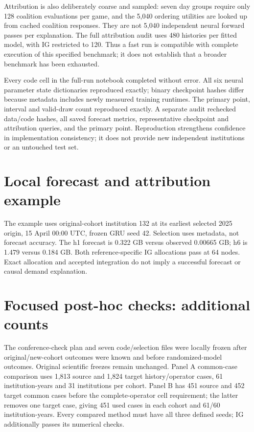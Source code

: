 \documentclass[conference]{IEEEtran}
\begin{document}
Attribution is also deliberately coarse and sampled: seven day groups require only 128 coalition evaluations per game, and the 5,040 ordering utilities are looked up from cached coalition responses. They are not 5,040 independent neural forward passes per explanation. The full attribution audit uses 480 histories per fitted model, with IG restricted to 120. Thus a fast run is compatible with complete execution of this specified benchmark; it does not establish that a broader benchmark has been exhausted.

Every code cell in the full-run notebook completed without error. All six neural parameter state dictionaries reproduced exactly; binary checkpoint hashes differ because metadata includes newly measured training runtimes. The primary point, interval and valid-draw count reproduced exactly. A separate audit rechecked data/code hashes, all saved forecast metrics, representative checkpoint and attribution queries, and the primary point. Reproduction strengthens confidence in implementation consistency; it does not provide new independent institutions or an untouched test set.


\section{Local forecast and attribution example}
The example uses original-cohort institution 132 at its earliest selected 2025 origin, 15 April 00:00 UTC, frozen GRU seed 42. Selection uses metadata, not forecast accuracy. The h1 forecast is 0.322 GB versus observed 0.00665 GB; h6 is 1.479 versus 0.184 GB. Both reference-specific IG allocations pass at 64 nodes. Exact allocation and accepted integration do not imply a successful forecast or causal demand explanation.


\section{Focused post-hoc checks: additional counts}
The conference-check plan and seven code/selection files were locally frozen after original/new-cohort outcomes were known and before randomized-model outcomes. Original scientific freezes remain unchanged. Panel A common-case comparison uses 1,813 source and 1,824 target history/operator cases, 61 institution-years and 31 institutions per cohort. Panel B has 451 source and 452 target common cases before the complete-operator cell requirement; the latter removes one target case, giving 451 used cases in each cohort and 61/60 institution-years. Every compared method must have all three defined seeds; IG additionally passes its numerical checks.
\end{document}
